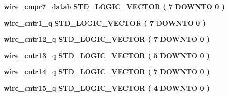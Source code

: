 \begin{DoxyCompactItemize}
\item 
{\bf wire\+\_\+cmpr7\+\_\+datab} {\bfseries \textcolor{comment}{S\+T\+D\+\_\+\+L\+O\+G\+I\+C\+\_\+\+V\+E\+C\+T\+OR}\textcolor{vhdlchar}{ }\textcolor{vhdlchar}{(}\textcolor{vhdlchar}{ }\textcolor{vhdlchar}{ } \textcolor{vhdldigit}{7} \textcolor{vhdlchar}{ }\textcolor{keywordflow}{D\+O\+W\+N\+TO}\textcolor{vhdlchar}{ }\textcolor{vhdlchar}{ } \textcolor{vhdldigit}{0} \textcolor{vhdlchar}{ }\textcolor{vhdlchar}{)}\textcolor{vhdlchar}{ }} 
\item 
{\bf wire\+\_\+cntr1\+\_\+q} {\bfseries \textcolor{comment}{S\+T\+D\+\_\+\+L\+O\+G\+I\+C\+\_\+\+V\+E\+C\+T\+OR}\textcolor{vhdlchar}{ }\textcolor{vhdlchar}{(}\textcolor{vhdlchar}{ }\textcolor{vhdlchar}{ } \textcolor{vhdldigit}{7} \textcolor{vhdlchar}{ }\textcolor{keywordflow}{D\+O\+W\+N\+TO}\textcolor{vhdlchar}{ }\textcolor{vhdlchar}{ } \textcolor{vhdldigit}{0} \textcolor{vhdlchar}{ }\textcolor{vhdlchar}{)}\textcolor{vhdlchar}{ }} 
\item 
{\bf wire\+\_\+cntr12\+\_\+q} {\bfseries \textcolor{comment}{S\+T\+D\+\_\+\+L\+O\+G\+I\+C\+\_\+\+V\+E\+C\+T\+OR}\textcolor{vhdlchar}{ }\textcolor{vhdlchar}{(}\textcolor{vhdlchar}{ }\textcolor{vhdlchar}{ } \textcolor{vhdldigit}{7} \textcolor{vhdlchar}{ }\textcolor{keywordflow}{D\+O\+W\+N\+TO}\textcolor{vhdlchar}{ }\textcolor{vhdlchar}{ } \textcolor{vhdldigit}{0} \textcolor{vhdlchar}{ }\textcolor{vhdlchar}{)}\textcolor{vhdlchar}{ }} 
\item 
{\bf wire\+\_\+cntr13\+\_\+q} {\bfseries \textcolor{comment}{S\+T\+D\+\_\+\+L\+O\+G\+I\+C\+\_\+\+V\+E\+C\+T\+OR}\textcolor{vhdlchar}{ }\textcolor{vhdlchar}{(}\textcolor{vhdlchar}{ }\textcolor{vhdlchar}{ } \textcolor{vhdldigit}{5} \textcolor{vhdlchar}{ }\textcolor{keywordflow}{D\+O\+W\+N\+TO}\textcolor{vhdlchar}{ }\textcolor{vhdlchar}{ } \textcolor{vhdldigit}{0} \textcolor{vhdlchar}{ }\textcolor{vhdlchar}{)}\textcolor{vhdlchar}{ }} 
\item 
{\bf wire\+\_\+cntr14\+\_\+q} {\bfseries \textcolor{comment}{S\+T\+D\+\_\+\+L\+O\+G\+I\+C\+\_\+\+V\+E\+C\+T\+OR}\textcolor{vhdlchar}{ }\textcolor{vhdlchar}{(}\textcolor{vhdlchar}{ }\textcolor{vhdlchar}{ } \textcolor{vhdldigit}{7} \textcolor{vhdlchar}{ }\textcolor{keywordflow}{D\+O\+W\+N\+TO}\textcolor{vhdlchar}{ }\textcolor{vhdlchar}{ } \textcolor{vhdldigit}{0} \textcolor{vhdlchar}{ }\textcolor{vhdlchar}{)}\textcolor{vhdlchar}{ }} 
\item 
{\bf wire\+\_\+cntr15\+\_\+q} {\bfseries \textcolor{comment}{S\+T\+D\+\_\+\+L\+O\+G\+I\+C\+\_\+\+V\+E\+C\+T\+OR}\textcolor{vhdlchar}{ }\textcolor{vhdlchar}{(}\textcolor{vhdlchar}{ }\textcolor{vhdlchar}{ } \textcolor{vhdldigit}{4} \textcolor{vhdlchar}{ }\textcolor{keywordflow}{D\+O\+W\+N\+TO}\textcolor{vhdlchar}{ }\textcolor{vhdlchar}{ } \textcolor{vhdldigit}{0} \textcolor{vhdlchar}{ }\textcolor{vhdlchar}{)}\textcolor{vhdlchar}{ }} 

\end{DoxyCompactItemize}

